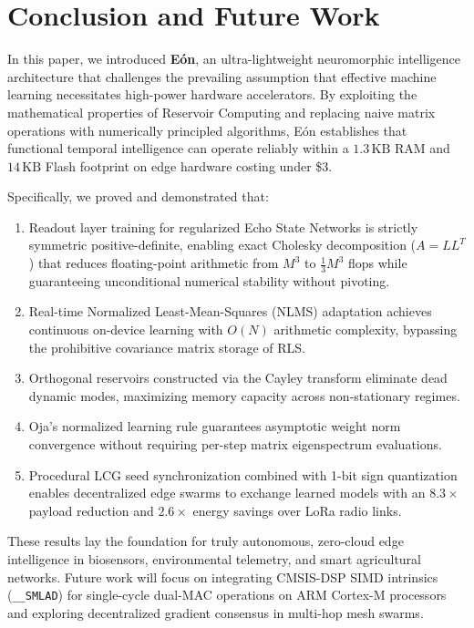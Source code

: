 \section{Conclusion and Future Work}

In this paper, we introduced \textbf{Eón}, an ultra-lightweight neuromorphic intelligence architecture that challenges the prevailing assumption that effective machine learning necessitates high-power hardware accelerators. By exploiting the mathematical properties of Reservoir Computing and replacing naive matrix operations with numerically principled algorithms, Eón establishes that functional temporal intelligence can operate reliably within a $1.3\,\text{KB}$ RAM and $14\,\text{KB}$ Flash footprint on edge hardware costing under \$3.

Specifically, we proved and demonstrated that:
\begin{enumerate}
    \item Readout layer training for regularized Echo State Networks is strictly symmetric positive-definite, enabling exact Cholesky decomposition ($A = L L^T$) that reduces floating-point arithmetic from $M^3$ to $\frac{1}{3} M^3$ flops while guaranteeing unconditional numerical stability without pivoting.
    \item Real-time Normalized Least-Mean-Squares (NLMS) adaptation achieves continuous on-device learning with $O(N)$ arithmetic complexity, bypassing the prohibitive covariance matrix storage of RLS.
    \item Orthogonal reservoirs constructed via the Cayley transform eliminate dead dynamic modes, maximizing memory capacity across non-stationary regimes.
    \item Oja's normalized learning rule guarantees asymptotic weight norm convergence without requiring per-step matrix eigenspectrum evaluations.
    \item Procedural LCG seed synchronization combined with 1-bit sign quantization enables decentralized edge swarms to exchange learned models with an $8.3\times$ payload reduction and $2.6\times$ energy savings over LoRa radio links.
\end{enumerate}

These results lay the foundation for truly autonomous, zero-cloud edge intelligence in biosensors, environmental telemetry, and smart agricultural networks. Future work will focus on integrating CMSIS-DSP SIMD intrinsics (\texttt{\_\_SMLAD}) for single-cycle dual-MAC operations on ARM Cortex-M processors and exploring decentralized gradient consensus in multi-hop mesh swarms.
